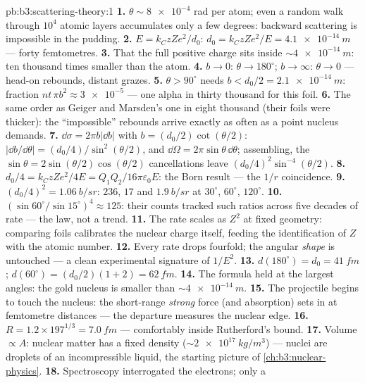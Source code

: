 \begin{solution}{pb:b3:scattering-theory:1}
\textbf{1.} $\theta \sim \num{8e-4}$ rad per atom; even a random
walk through $10^4$ atomic layers accumulates only a few degrees:
backward scattering is impossible in the pudding.
\textbf{2.} $E = k_CzZe^2/d_0$: $d_0 = k_CzZe^2/E =
\qty{4.1e-14}{m}$ --- forty femtometres.
\textbf{3.} That the full positive charge sits inside
$\sim\qty{4e-14}{m}$: ten thousand times smaller than the atom.
\textbf{4.} $b \to 0$: $\theta \to 180^\circ$; $b \to \infty$:
$\theta \to 0$ --- head-on rebounds, distant grazes.
\textbf{5.} $\theta > 90^\circ$ needs $b < d_0/2 =
\qty{2.1e-14}{m}$: fraction $nt\,\pi b^2 \approx \num{3e-5}$ ---
one alpha in thirty thousand for this foil.
\textbf{6.} The same order as Geiger and Marsden's one in eight
thousand (their foils were thicker): the ``impossible'' rebounds
arrive exactly as often as a point nucleus demands.
\textbf{7.} $\dd\sigma = 2\pi b|\dd b|$ with $b =
(d_0/2)\cot(\theta/2)$: $|\dd b/\dd\theta| = (d_0/4)/\sin^2(
\theta/2)$, and $\dd\Omega = 2\pi\sin\theta\,\dd\theta$;
assembling, the $\sin\theta = 2\sin(\theta/2)\cos(\theta/2)$
cancellations leave $(d_0/4)^2\sin^{-4}(\theta/2)$.
\textbf{8.} $d_0/4 = k_CzZe^2/4E = Q_1Q_2/16\pi\varepsilon_0E$:
the Born result --- the $1/r$ coincidence.
\textbf{9.} $(d_0/4)^2 = \qty{1.06}{b/sr}$: $236$, $17$ and
$\qty{1.9}{b/sr}$ at $30^\circ$, $60^\circ$, $120^\circ$.
\textbf{10.} $(\sin60^\circ/\sin15^\circ)^4 \approx 125$: their
counts tracked such ratios across five decades of rate --- the
law, not a trend.
\textbf{11.} The rate scales as $Z^2$ at fixed geometry:
comparing foils calibrates the nuclear charge itself, feeding the
identification of $Z$ with the atomic number.
\textbf{12.} Every rate drops fourfold; the angular \emph{shape}
is untouched --- a clean experimental signature of $1/E^2$.
\textbf{13.} $d(180^\circ) = d_0 = \qty{41}{fm}$; $d(60^\circ) =
(d_0/2)(1 + 2) = \qty{62}{fm}$.
\textbf{14.} The formula held at the largest angles: the gold
nucleus is smaller than $\sim\qty{4e-14}{m}$.
\textbf{15.} The projectile begins to touch the nucleus: the
short-range \emph{strong} force (and absorption) sets in at
femtometre distances --- the departure measures the nuclear
edge.
\textbf{16.} $R = 1.2 \times 197^{1/3} = \qty{7.0}{fm}$ ---
comfortably inside Rutherford's bound.
\textbf{17.} Volume $\propto A$: nuclear matter has a fixed
density ($\sim\qty{2e17}{kg/m^3}$) --- nuclei are droplets of an
incompressible liquid, the starting picture of
\cref{ch:b3:nuclear-physics}.
\textbf{18.} Spectroscopy interrogated the electrons; only a

\end{solution}
